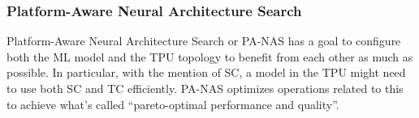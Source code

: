 \subsubsection{Platform-Aware Neural Architecture Search}
Platform-Aware Neural Architecture Search or PA-NAS has a goal to configure both the ML model and the TPU topology to benefit from each other as much as possible.
In particular, with the mention of SC, a model in the TPU might need to use both SC and TC efficiently.
PA-NAS optimizes operations related to this to achieve what's called ``pareto-optimal performance and quality''.